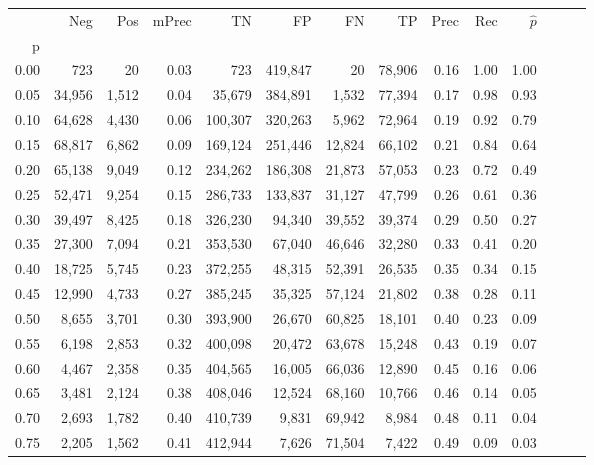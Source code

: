 \begin{tabular}{rrrrrrrrrrrrrr}
\toprule
{} &     Neg &    Pos & mPrec &       TN &       FP &      FN &      TP &  Prec &   Rec & $\hat{p}$ \\
p    &         &        &       &          &          &         &         &       &       &           \\
\midrule
0.00 &     723 &     20 &  0.03 &      723 &  419,847 &      20 &  78,906 &  0.16 &  1.00 &      1.00 \\
0.05 &  34,956 &  1,512 &  0.04 &   35,679 &  384,891 &   1,532 &  77,394 &  0.17 &  0.98 &      0.93 \\
0.10 &  64,628 &  4,430 &  0.06 &  100,307 &  320,263 &   5,962 &  72,964 &  0.19 &  0.92 &      0.79 \\
0.15 &  68,817 &  6,862 &  0.09 &  169,124 &  251,446 &  12,824 &  66,102 &  0.21 &  0.84 &      0.64 \\
0.20 &  65,138 &  9,049 &  0.12 &  234,262 &  186,308 &  21,873 &  57,053 &  0.23 &  0.72 &      0.49 \\
0.25 &  52,471 &  9,254 &  0.15 &  286,733 &  133,837 &  31,127 &  47,799 &  0.26 &  0.61 &      0.36 \\
0.30 &  39,497 &  8,425 &  0.18 &  326,230 &   94,340 &  39,552 &  39,374 &  0.29 &  0.50 &      0.27 \\
0.35 &  27,300 &  7,094 &  0.21 &  353,530 &   67,040 &  46,646 &  32,280 &  0.33 &  0.41 &      0.20 \\
0.40 &  18,725 &  5,745 &  0.23 &  372,255 &   48,315 &  52,391 &  26,535 &  0.35 &  0.34 &      0.15 \\
0.45 &  12,990 &  4,733 &  0.27 &  385,245 &   35,325 &  57,124 &  21,802 &  0.38 &  0.28 &      0.11 \\
0.50 &   8,655 &  3,701 &  0.30 &  393,900 &   26,670 &  60,825 &  18,101 &  0.40 &  0.23 &      0.09 \\
0.55 &   6,198 &  2,853 &  0.32 &  400,098 &   20,472 &  63,678 &  15,248 &  0.43 &  0.19 &      0.07 \\
0.60 &   4,467 &  2,358 &  0.35 &  404,565 &   16,005 &  66,036 &  12,890 &  0.45 &  0.16 &      0.06 \\
0.65 &   3,481 &  2,124 &  0.38 &  408,046 &   12,524 &  68,160 &  10,766 &  0.46 &  0.14 &      0.05 \\
0.70 &   2,693 &  1,782 &  0.40 &  410,739 &    9,831 &  69,942 &   8,984 &  0.48 &  0.11 &      0.04 \\
0.75 &   2,205 &  1,562 &  0.41 &  412,944 &    7,626 &  71,504 &   7,422 &  0.49 &  0.09 &      0.03 \\

\end{tabular}
